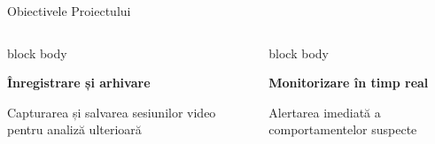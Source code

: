 \documentclass[aspectratio=169,9pt]{beamer}
\begin{document}
\begin{frame}{Obiectivele Proiectului}
\begin{columns}[T]
\begin{beamercolorbox}[rounded=true,shadow=true,sep=1em]{block body}
\begin{center}
                                        \textbf{Înregistrare și arhivare}
                                        \vspace{0.1cm}
                                        
                                        \small Capturarea și salvarea sesiunilor video pentru analiză ulterioară
                                \end{center}
                        \end{beamercolorbox}
                        
                        \vspace{0.4cm}
                        
                        \begin{beamercolorbox}[rounded=true,shadow=true,sep=1em]{block body}
                                \begin{center}
                                        {\fontsize{24}{24}\selectfont\textcolor{mainblue}{\faSearch}}
                                        \vspace{0.2cm}
                                        
                                        \textbf{Monitorizare în timp real}
                                        \vspace{0.1cm}
                                        
                                        \small Alertarea imediată a comportamentelor suspecte
                                \end{center}
                        \end{beamercolorbox}
        \end{columns}
\end{frame}
\end{document}
